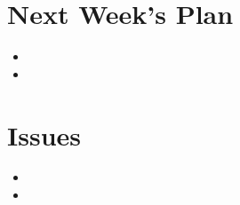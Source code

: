 \documentclass[11pt]{article}
\begin{document}
\section{Next Week's Plan}
\begin{itemize}
\item
\item
\end{itemize}

%
%
\section{Issues}
\begin{itemize}
\item
\item
\end{itemize}
\end{document}
